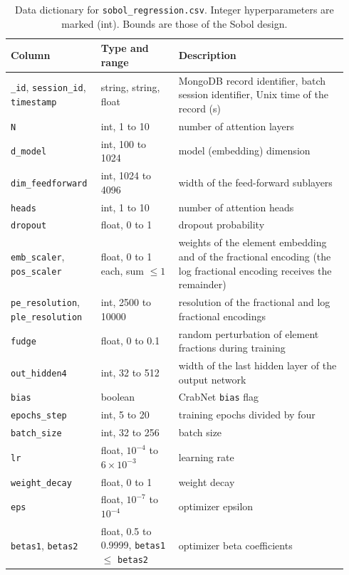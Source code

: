 \documentclass[pdflatex,sn-mathphys-num]{sn-jnl}
\begin{document}
\begin{table}[h]
\caption{Data dictionary for \texttt{sobol\_regression.csv}. Integer hyperparameters are marked (int). Bounds are those of the Sobol design.}\label{tab:dictionary}
\footnotesize
\begin{tabular}{@{}p{0.24\linewidth}p{0.22\linewidth}p{0.48\linewidth}@{}}
\toprule
\textbf{Column} & \textbf{Type and range} & \textbf{Description} \\
\midrule
\texttt{\_id}, \texttt{session\_id}, \texttt{timestamp} & string, string, float & MongoDB record identifier, batch session identifier, Unix time of the record (s) \\
\texttt{N} & int, 1 to 10 & number of attention layers \\
\texttt{d\_model} & int, 100 to 1024 & model (embedding) dimension \\
\texttt{dim\_feedforward} & int, 1024 to 4096 & width of the feed-forward sublayers \\
\texttt{heads} & int, 1 to 10 & number of attention heads \\
\texttt{dropout} & float, 0 to 1 & dropout probability \\
\texttt{emb\_scaler}, \texttt{pos\_scaler} & float, 0 to 1 each, sum $\le 1$ & weights of the element embedding and of the fractional encoding (the log fractional encoding receives the remainder) \\
\texttt{pe\_resolution}, \texttt{ple\_resolution} & int, 2500 to 10000 & resolution of the fractional and log fractional encodings \\
\texttt{fudge} & float, 0 to 0.1 & random perturbation of element fractions during training \\
\texttt{out\_hidden4} & int, 32 to 512 & width of the last hidden layer of the output network \\
\texttt{bias} & boolean & CrabNet \texttt{bias} flag \\
\texttt{epochs\_step} & int, 5 to 20 & training epochs divided by four \\
\texttt{batch\_size} & int, 32 to 256 & batch size \\
\texttt{lr} & float, $10^{-4}$ to $6\times10^{-3}$ & learning rate \\
\texttt{weight\_decay} & float, 0 to 1 & weight decay \\
\texttt{eps} & float, $10^{-7}$ to $10^{-4}$ & optimizer epsilon \\
\texttt{betas1}, \texttt{betas2} & float, 0.5 to 0.9999, \texttt{betas1} $\le$ \texttt{betas2} & optimizer beta coefficients \\

\end{tabular}
\end{table}
\end{document}
